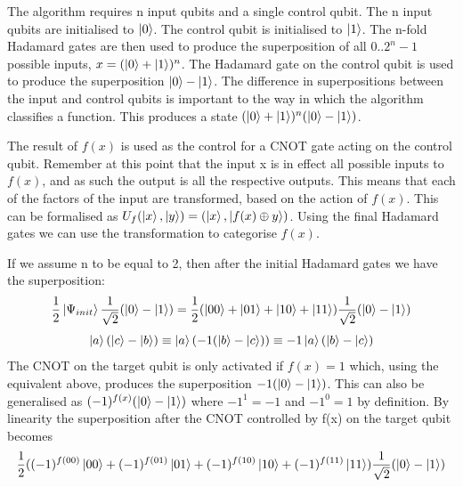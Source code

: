 \documentclass[authoryearcitations]{UoYCSproject}
\begin{document}
The algorithm requires n input qubits and a single control qubit.
The n input qubits are initialised to $\left\vert{0}\right\rangle$.
The control qubit is initialised to $\left\vert{1}\right\rangle$.
The n-fold Hadamard gates are then used to produce the superposition of all $0..2^n-1$ possible inputs, $x=(\left\vert{0}\right\rangle+\left\vert{1}\right\rangle)^n$.
The Hadamard gate on the control qubit is used to produce the superposition $\left\vert{0}\right\rangle-\left\vert{1}\right\rangle$.
The difference in superpositions between the input and control qubits is important to the way in which the algorithm classifies a function.
This produces a state  $(\left\vert{0}\right\rangle+\left\vert{1}\right\rangle)^n(\left\vert{0}\right\rangle-\left\vert{1}\right\rangle)$.

The result of $f(x)$ is used as the control for a CNOT gate acting on the control qubit.
Remember at this point that the input x is in effect all possible inputs to $f(x)$, and as such the output is all the respective outputs.
This means that each of the factors of the input are transformed, based on the action of $f(x)$.
This can be formalised as $U_f(\left\vert{x}\right\rangle,\left\vert{y}\right\rangle)=(\left\vert{x}\right\rangle,\left\vert{f(x)\oplus{y}}\right\rangle)$.
Using the final Hadamard gates we can use the transformation to categorise $f(x)$.

If we assume n to be equal to 2, then after the initial Hadamard gates we have the superposition:
\begin{equation*}
\frac{1}{2}\left\vert{\Psi_{init}}\right\rangle\frac{1}{\sqrt{2}}(\left\vert{0}\right\rangle-\left\vert{1}\right\rangle)=\frac{1}{2}(\left\vert{00}\right\rangle+\left\vert{01}\right\rangle+\left\vert{10}\right\rangle+\left\vert{11}\right\rangle)\frac{1}{\sqrt{2}}(\left\vert{0}\right\rangle-\left\vert{1}\right\rangle)
\end{equation*}
\begin{equation}
\left\vert{a}\right\rangle(\left\vert{c}\right\rangle-\left\vert{b}\right\rangle)\equiv\left\vert{a}\right\rangle(-1(\left\vert{b}\right\rangle-\left\vert{c}\right\rangle))\equiv-1\left\vert{a}\right\rangle(\left\vert{b}\right\rangle-\left\vert{c}\right\rangle)
\label{target_qubit_identity}
\end{equation}
The CNOT on the target qubit is only activated if $f(x)=1$ which, using the equivalent above, produces the superposition $-1(\left\vert{0}\right\rangle-\left\vert{1}\right\rangle)$.
This can also be generalised as $(-1)^{f(x)}(\left\vert{0}\right\rangle-\left\vert{1}\right\rangle)$ where $-1^1=-1$ and $-1^0=1$ by definition.
By linearity the superposition after the CNOT controlled by f(x) on the target qubit becomes
\begin{equation*}
\frac{1}{2}((-1)^{f(00)}\left\vert{00}\right\rangle+(-1)^{f(01)}\left\vert{01}\right\rangle+(-1)^{f(10)}\left\vert{10}\right\rangle+(-1)^{f(11)}\left\vert{11}\right\rangle)\frac{1}{\sqrt{2}}(\left\vert{0}\right\rangle-\left\vert{1}\right\rangle)
\end{equation*}
\end{document}
